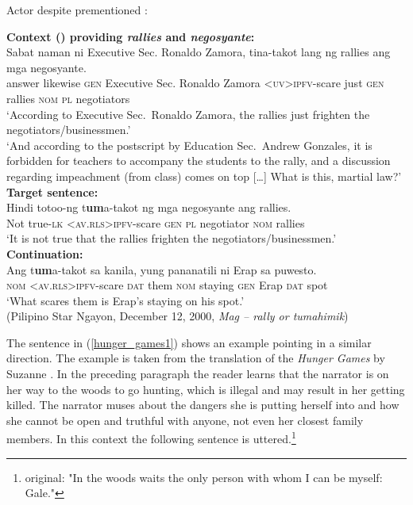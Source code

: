 \documentclass[output=paper,
,modfonts
,nonflat]{langsci/langscibook}
\begin{document}
\newpage 
\begin{exe}
\ex\label{given_undergoer1} Actor  despite prementioned :\\
\begin{xlist}
\ex\label{given_u_context1}\textbf{Context () providing \textit{rallies} and \textit{negosyante}:}\\
\gll Sabat naman ni Executive Sec. Ronaldo Zamora, t{\USSmaller}in{\USGreater}a-takot lang ng rallies ang mga negosyante.\\
answer likewise \textsc{gen} Executive Sec. Ronaldo Zamora \textsc{<uv>ipfv}-scare    just    \textsc{gen} rallies \textsc{nom} \textsc{pl} negotiators\\
\glt `According to Executive Sec.\ Ronaldo Zamora, the rallies just frighten the negotiators/businessmen.' 
\\
`And according to the postscript by Education Sec.\ Andrew Gonzales, it is forbidden for teachers to accompany the students to the rally, and a discussion regarding impeachment (from class) comes on top [\dots] What is this, martial law?'
\ex\label{given_u_target1}\textbf{Target sentence:}\\
\gll Hindi totoo-ng t{\USSmaller}\textbf{um}{\USGreater}a-takot {{\ob}ng} mga {negosyante{\cb}\ug} {{\ob}ang} {rallies{\cb}\act}.\\
Not true-\textsc{lk} \textsc{<av.rls>ipfv}-scare \textsc{\void{[}gen} \textsc{pl} negotiator \textsc{\void{[}nom} rallies\\
\glt `It is not true that the rallies frighten the negotiators/businessmen.'
\ex\label{given_u_cont1}\textbf{Continuation:}\\
\gll Ang t{\USSmaller}\textbf{um}{\USGreater}a-takot {{\ob}sa} {kanila{\cb}\ug,} {{\ob}yung} pananatili ni Erap sa {puwesto{\cb}\act}.\\
  \textsc{nom} \textsc{<av.rls>ipfv}-scare \textsc{\void{[}dat} them \textsc{\void{[}nom} staying \textsc{gen} Erap \textsc{dat} spot\\
\glt `What scares them is Erap’s staying on his spot.'\\
\hfill (Pilipino Star Ngayon, December 12, 2000, \textit{Mag -- rally or tumahimik})
\end{xlist}
\end{exe}

\noindent The sentence in (\ref{hunger_games1}) shows an example pointing in a similar direction. The example is taken from the  translation of the \textit{Hunger Games} by Suzanne \citet{collins09}. In the preceding paragraph the reader learns that the narrator is on her way to the woods to go hunting, which is illegal and may result in her getting killed. The narrator muses about the dangers she is putting herself into and how she cannot be open and truthful with anyone, not even her closest family members. In this context the following sentence is uttered.\footnote{ original: "In the woods waits the only person with whom I can be myself: Gale."}
\end{document}
